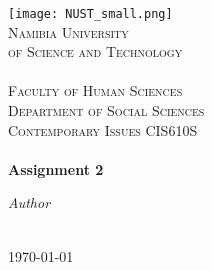 \begin{titlepage}
        \begin{center}

                \vspace*{0.2cm}
                \texttt{[image: NUST\_small.png]}\\[0.3cm]
                \textsc{\LARGE Namibia University}\\[0.25cm]
                \textsc{\LARGE of Science and Technology}\\[1.0cm]

                \HRule\\[0.4cm]
                \textsc{\Large Faculty of Human Sciences}\\[0.5cm]
                \textsc{\Large Department of Social Sciences}\\[.5cm]
                \textsc{\Large Contemporary Issues CIS610S}\\[0.5cm]

                \HRule\\[0.4cm]
                {\LARGE \bfseries Assignment 2}\\
                \vspace*{0.2cm}

                \emph{Author}\\[0.1cm]
                \noindent{}\\[1cm]

                \vfill

                {\large \today}

        \end{center}
\end{titlepage}
